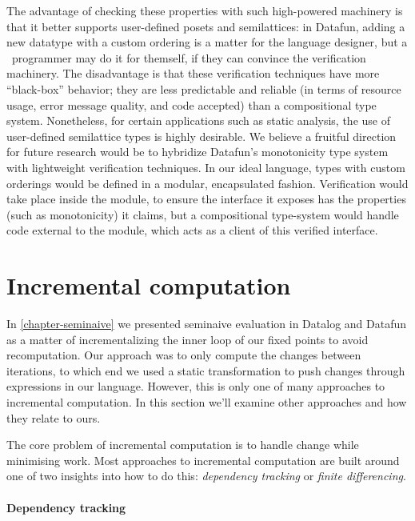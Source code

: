 The advantage of checking these properties with such high-powered machinery is
that it better supports user-defined posets and semilattices: in Datafun, adding
a new datatype with a custom ordering is a matter for the language designer, but
a \flix\ programmer may do it for themself, if they can convince the verification machinery.
%
The disadvantage is that these verification techniques have more ``black-box'' behavior; they are less predictable and reliable (in terms of resource usage, error message quality, and code accepted) than a compositional type system.
%
Nonetheless, for certain applications such as static analysis, the use of user-defined semilattice types is highly desirable.
%
We believe a fruitful direction for future research would be to hybridize Datafun's monotonicity type system with lightweight verification techniques. In our ideal language, types with custom orderings would be defined in a modular, encapsulated fashion. Verification would take place inside the module, to ensure the interface it exposes has the properties (such as monotonicity) it claims, but a compositional type-system would handle code external to the module, which acts as a client of this verified interface.



\section{Incremental computation}
\label{section-related-work-incremental-computation}

In \cref{chapter-seminaive} we presented seminaive evaluation in Datalog and
Datafun as a matter of incrementalizing the inner loop of our fixed points to
avoid recomputation. Our approach was to only compute the changes between
iterations, to which end we used a static transformation to push changes through
expressions in our language.
%
However, this is only one of many approaches to incremental computation.
%
In this section we'll examine other approaches and how they relate to ours.

The core problem of incremental computation is to handle change while minimising work.
%
Most approaches to incremental computation are built around one of two insights
into how to do this: \emph{dependency tracking} or \emph{finite differencing}.

\paragraph{Dependency tracking}

